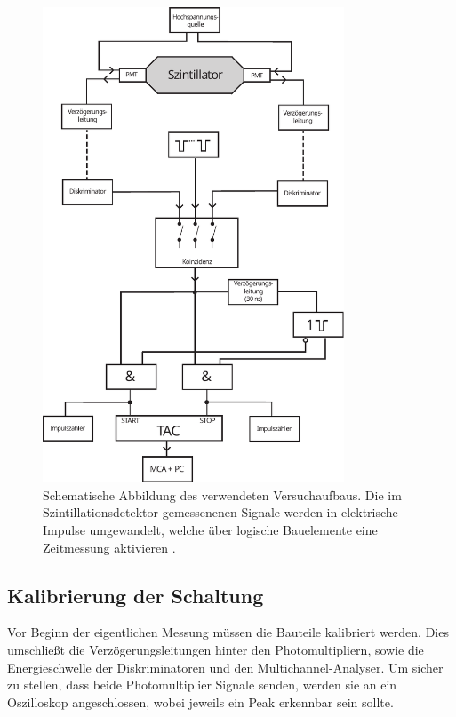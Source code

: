 \begin{figure}
    \centering
    \includegraphics[width=0.8\textwidth]{content/img/Abb_1.pdf}
    \caption{Schematische Abbildung des verwendeten Versuchaufbaus.
    Die im Szintillationsdetektor gemessenenen Signale werden in elektrische Impulse umgewandelt,
    welche über logische Bauelemente eine Zeitmessung aktivieren \cite{versuchsanleitung}.}
    \label{fig:versuchsaufbau}
\end{figure}

\subsection{Kalibrierung der Schaltung}

Vor Beginn der eigentlichen Messung müssen die Bauteile kalibriert werden.
Dies umschließt die Verzögerungsleitungen hinter den Photomultipliern,
sowie die Energieschwelle der Diskriminatoren und den Multichannel-Analyser.
Um sicher zu stellen,
dass beide Photomultiplier Signale senden,
werden sie an ein Oszilloskop angeschlossen,
wobei jeweils ein Peak erkennbar sein sollte. 

